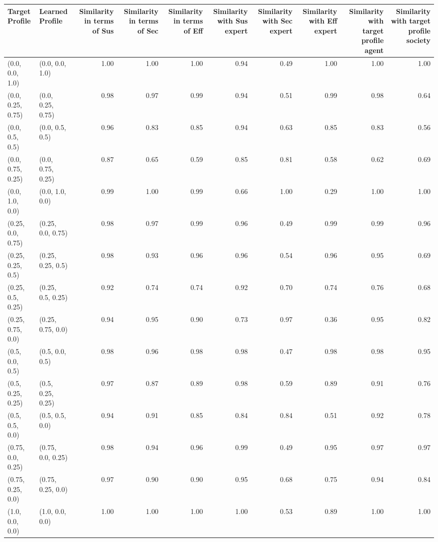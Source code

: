 \begin{tabular}{llrrrrrrrr}
\toprule
Target Profile & Learned Profile & Similarity in terms of Sus & Similarity in terms of Sec & Similarity in terms of Eff & Similarity with Sus expert & Similarity with Sec expert & Similarity with Eff expert & Similarity with target profile agent & Similarity with target profile society \\
\midrule
(0.0, 0.0, 1.0) & (0.0, 0.0, 1.0) & 1.00 & 1.00 & 1.00 & 0.94 & 0.49 & 1.00 & 1.00 & 1.00 \\
(0.0, 0.25, 0.75) & (0.0, 0.25, 0.75) & 0.98 & 0.97 & 0.99 & 0.94 & 0.51 & 0.99 & 0.98 & 0.64 \\
(0.0, 0.5, 0.5) & (0.0, 0.5, 0.5) & 0.96 & 0.83 & 0.85 & 0.94 & 0.63 & 0.85 & 0.83 & 0.56 \\
(0.0, 0.75, 0.25) & (0.0, 0.75, 0.25) & 0.87 & 0.65 & 0.59 & 0.85 & 0.81 & 0.58 & 0.62 & 0.69 \\
(0.0, 1.0, 0.0) & (0.0, 1.0, 0.0) & 0.99 & 1.00 & 0.99 & 0.66 & 1.00 & 0.29 & 1.00 & 1.00 \\
(0.25, 0.0, 0.75) & (0.25, 0.0, 0.75) & 0.98 & 0.97 & 0.99 & 0.96 & 0.49 & 0.99 & 0.99 & 0.96 \\
(0.25, 0.25, 0.5) & (0.25, 0.25, 0.5) & 0.98 & 0.93 & 0.96 & 0.96 & 0.54 & 0.96 & 0.95 & 0.69 \\
(0.25, 0.5, 0.25) & (0.25, 0.5, 0.25) & 0.92 & 0.74 & 0.74 & 0.92 & 0.70 & 0.74 & 0.76 & 0.68 \\
(0.25, 0.75, 0.0) & (0.25, 0.75, 0.0) & 0.94 & 0.95 & 0.90 & 0.73 & 0.97 & 0.36 & 0.95 & 0.82 \\
(0.5, 0.0, 0.5) & (0.5, 0.0, 0.5) & 0.98 & 0.96 & 0.98 & 0.98 & 0.47 & 0.98 & 0.98 & 0.95 \\
(0.5, 0.25, 0.25) & (0.5, 0.25, 0.25) & 0.97 & 0.87 & 0.89 & 0.98 & 0.59 & 0.89 & 0.91 & 0.76 \\
(0.5, 0.5, 0.0) & (0.5, 0.5, 0.0) & 0.94 & 0.91 & 0.85 & 0.84 & 0.84 & 0.51 & 0.92 & 0.78 \\
(0.75, 0.0, 0.25) & (0.75, 0.0, 0.25) & 0.98 & 0.94 & 0.96 & 0.99 & 0.49 & 0.95 & 0.97 & 0.97 \\
(0.75, 0.25, 0.0) & (0.75, 0.25, 0.0) & 0.97 & 0.90 & 0.90 & 0.95 & 0.68 & 0.75 & 0.94 & 0.84 \\
(1.0, 0.0, 0.0) & (1.0, 0.0, 0.0) & 1.00 & 1.00 & 1.00 & 1.00 & 0.53 & 0.89 & 1.00 & 1.00 \\
\bottomrule
\end{tabular}
